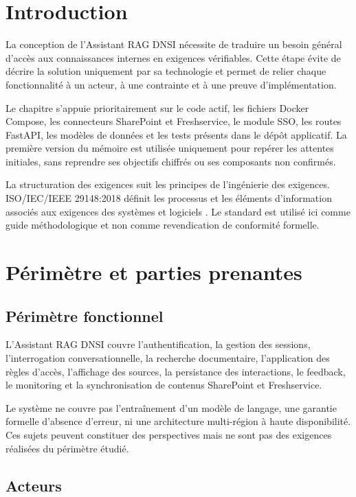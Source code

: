 \section{Introduction}

La conception de l'Assistant RAG DNSI nécessite de traduire un besoin général d'accès aux connaissances internes en exigences vérifiables. Cette étape évite de décrire la solution uniquement par sa technologie et permet de relier chaque fonctionnalité à un acteur, à une contrainte et à une preuve d'implémentation.

Le chapitre s'appuie prioritairement sur le code actif, les fichiers Docker Compose, les connecteurs SharePoint et Freshservice, le module SSO, les routes FastAPI, les modèles de données et les tests présents dans le dépôt applicatif. La première version du mémoire est utilisée uniquement pour repérer les attentes initiales, sans reprendre ses objectifs chiffrés ou ses composants non confirmés.

La structuration des exigences suit les principes de l'ingénierie des exigences. ISO/IEC/IEEE 29148:2018 définit les processus et les éléments d'information associés aux exigences des systèmes et logiciels \citep{ISO29148_2018}. Le standard est utilisé ici comme guide méthodologique et non comme revendication de conformité formelle.

\section{Périmètre et parties prenantes}

\subsection{Périmètre fonctionnel}

L'Assistant RAG DNSI couvre l'authentification, la gestion des sessions, l'interrogation conversationnelle, la recherche documentaire, l'application des règles d'accès, l'affichage des sources, la persistance des interactions, le feedback, le monitoring et la synchronisation de contenus SharePoint et Freshservice.

Le système ne couvre pas l'entraînement d'un modèle de langage, une garantie formelle d'absence d'erreur, ni une architecture multi-région à haute disponibilité. Ces sujets peuvent constituer des perspectives mais ne sont pas des exigences réalisées du périmètre étudié.

\subsection{Acteurs}

